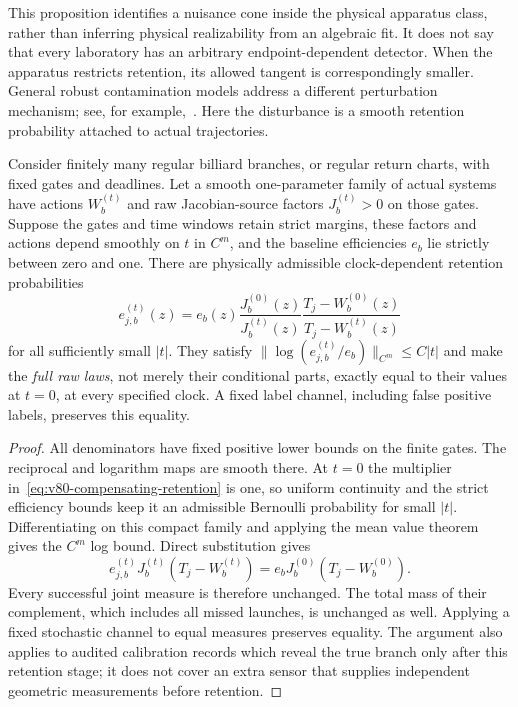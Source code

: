 This proposition identifies a nuisance cone inside the physical
apparatus class, rather than inferring physical realizability from an
algebraic fit.  It does not say that every laboratory has an arbitrary
endpoint-dependent detector.  When the apparatus restricts retention,
its allowed tangent is correspondingly smaller.  General robust
contamination models address a different perturbation mechanism;
see, for example,~\cite{UppalSinghPoczos2020}.  Here the disturbance
is a smooth retention probability attached to actual trajectories.

\begin{theorem}
\label{thm:v80-physical-compensation}
Consider finitely many regular billiard branches, or regular return
charts, with fixed gates and deadlines.  Let a smooth one-parameter
family of actual systems have actions $W_b^{(t)}$ and raw Jacobian-source
factors $J_b^{(t)}>0$ on those gates.  Suppose the gates and time windows
retain strict margins, these factors and actions depend smoothly on
$t$ in $C^m$, and the baseline efficiencies $e_b$ lie strictly between
zero and one.  There are physically admissible clock-dependent
retention probabilities
\begin{equation}\label{eq:v80-compensating-retention}
 e_{j,b}^{(t)}(z)=e_b(z)\frac{J_b^{(0)}(z)}{J_b^{(t)}(z)}
                \frac{T_j-W_b^{(0)}(z)}{T_j-W_b^{(t)}(z)}
\end{equation}
for all sufficiently small $|t|$.  They satisfy
$\|\log(e_{j,b}^{(t)}/e_b)\|_{C^m}\le C|t|$ and make the
\emph{full raw laws}, not merely their conditional parts, exactly equal
to their values at $t=0$, at every specified clock.  A fixed label
channel, including false positive labels, preserves this equality.
\end{theorem}
\begin{proof}
All denominators have fixed positive lower bounds on the finite gates.
The reciprocal and logarithm maps are smooth there.  At $t=0$ the
multiplier in~\eqref{eq:v80-compensating-retention} is one, so uniform
continuity and the strict efficiency bounds keep it an admissible
Bernoulli probability for small $|t|$.  Differentiating on this compact
family and applying the mean value theorem gives the $C^m$ log bound.
Direct substitution gives
\[
 e_{j,b}^{(t)}J_b^{(t)}(T_j-W_b^{(t)})
                    =e_bJ_b^{(0)}(T_j-W_b^{(0)}).
\]
Every successful joint measure is therefore unchanged.  The total mass
of their complement, which includes all missed launches, is unchanged
as well.  Applying a fixed stochastic channel to equal measures
preserves equality.  The argument also applies to audited calibration
records which reveal the true branch only after this retention stage;
it does not cover an extra sensor that supplies independent geometric
measurements before retention.
\end{proof}

